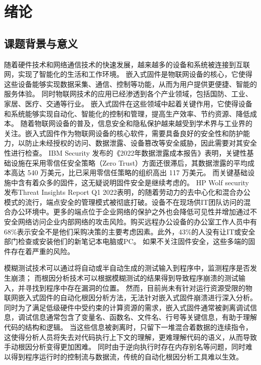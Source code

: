\cleardoublepage

\section{绪论}


\subsection{课题背景与意义}
随着硬件技术和网络通信技术的快速发展，越来越多的设备和系统被连接到互联网，实现了智能化的生活和工作环境。
嵌入式固件是物联网设备的核心，它使得这些设备能够实现数据采集、通信、控制等功能，从而为用户提供更便捷、智能的服务体验。
同时物联网技术的应用已经渗透到各个产业领域，包括国防、工业、家居、医疗、交通等行业。
嵌入式固件在这些领域中起着关键作用，它使得设备和系统能够实现自动化、智能化的控制和管理，提高生产效率、节约资源、降低成本。
随着物联网设备的普及，信息安全和隐私保护越来越受到学术界与工业界的关注。嵌入式固件作为物联网设备的核心软件，需要具备良好的安全性和防护能力，以防止未经授权的访问、数据泄露、设备篡改等安全威胁，因此需要对其安全性进行检查。
IBM Security 发布的《2022年数据泄露成本报告》\cite{Cost}表明，关键性基础设施在采用零信任安全策略（Zero Trust）方面还很滞后，其数据泄露的平均成本高达 540 万美元，比已采用零信任策略的组织高出 117 万美元。
而关键基础设施中含有着众多的固件，这无疑说明固件安全是继续考虑的。
HP Wolf security 发布Threat Insights Report Q1 2022\cite{HP-Wolf}表明，的随着劳动力的去中心化和混合办公模式的流行，端点安全的管理模式被彻底打破。设备不在现场供IT团队访问的混合办公环境中。更多的端点位于企业网络的保护之外也会降低可见性并增加通过不安全网络访问企业内部网络的攻击风险。购买远程办公设备的办公室工作人员中有68\%表示安全不是他们采购决策的主要考虑因素。此外，43\%的人没有让IT或安全部门检查或安装他们的新笔记本电脑或PC。
如果不关注固件安全，这些多端的固件存在着严重的风险。

模糊测试技术可以通过将自动或半自动生成的测试输入到程序中，监测程序是否发生崩溃；
而根因分析技术可以根据模糊测试的结果得到导致程序崩溃的测试输入，并寻找到程序中存在漏洞的位置。
然而，目前尚未有针对运行资源受限的物联网嵌入式固件的自动化根因分析方法，无法针对嵌入式固件崩溃进行深入分析。
同时为了满足低级硬件中受约束的计算资源的需求，嵌入式固件通常被剥离调试信息，调试信息通常包含了变量名、函数名、文件名、行号等关键信息，有助于理解代码的结构和逻辑。
当这些信息被剥离时，只留下一堆混合着数据的连续指令，这使得分析人员将失去对代码执行上下文的理解，更难理解代码的语义，从而导致手动根因分析变得更加困难。
同时由于逆向执行时存在内存别名等问题，同时难以得到程序运行时的控制流与数据流，传统的自动化根因分析工具难以生效。

